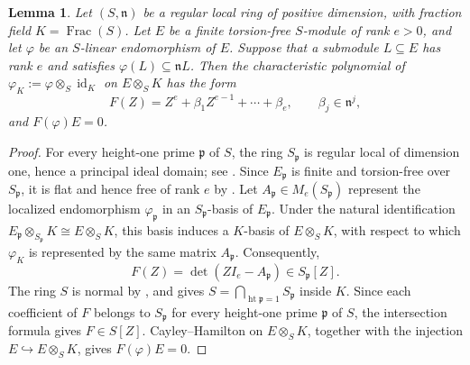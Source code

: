 \documentclass[11pt,reqno]{amsart}
\numberwithin{equation}{section}
\newtheorem{lemma}[theorem]{Lemma}
\theoremstyle{definition}
\begin{document}
\begin{lemma}
\label{lem:characteristic-coefficients}
Let $(S,\mathfrak n)$ be a regular local ring of positive dimension,
with fraction field $K=\operatorname{Frac}(S)$. Let $E$ be a finite
torsion-free $S$-module
of rank $e>0$, and let $\varphi$ be an $S$-linear endomorphism of $E$.
Suppose that a submodule $L\subseteq E$ has rank $e$ and satisfies
$\varphi(L)\subseteq\mathfrak nL$. Then the characteristic polynomial
of $\varphi_K:=\varphi\otimes_S\operatorname{id}_K$ on
$E\otimes_SK$ has the form
\[
 F(Z)=Z^e+\beta_1Z^{e-1}+\cdots+\beta_e,
 \qquad \beta_j\in\mathfrak n^j,
\]
and $F(\varphi)E=0$.
\end{lemma}
\begin{proof}
For every height-one prime $\mathfrak p$ of $S$, the ring
$S_{\mathfrak p}$ is regular local of dimension one, hence a
principal ideal domain; see
\cite[Theorems~11.2 and~19.3]{Matsumura1989}.
Since $E_{\mathfrak p}$ is finite and torsion-free over
$S_{\mathfrak p}$, it is flat and hence free of rank $e$ by
\cite[Theorems~7.7 and~7.10]{Matsumura1989}.
Let $A_{\mathfrak p}\in M_e(S_{\mathfrak p})$ represent the localized
endomorphism $\varphi_{\mathfrak p}$ in an $S_{\mathfrak p}$-basis of
$E_{\mathfrak p}$. Under the natural identification
$E_{\mathfrak p}\otimes_{S_{\mathfrak p}}K\cong E\otimes_SK$,
this basis induces a $K$-basis of $E\otimes_SK$, with respect to
which $\varphi_K$ is represented by the same matrix $A_{\mathfrak p}$.
Consequently,
\[
 F(Z)=\det(ZI_e-A_{\mathfrak p})\in S_{\mathfrak p}[Z].
\]
The ring $S$ is normal by \cite[Theorem~19.4]{Matsumura1989}, and
\cite[Proposition~4.10.4]{HunekeSwanson2006} gives
$S=\bigcap_{\operatorname{ht}\mathfrak p=1}S_{\mathfrak p}$ inside $K$.
Since each coefficient of $F$ belongs to $S_{\mathfrak p}$ for every
height-one prime $\mathfrak p$ of $S$, the intersection formula gives
$F\in S[Z]$.
Cayley--Hamilton on $E\otimes_SK$, together with the injection
$E\hookrightarrow E\otimes_SK$, gives $F(\varphi)E=0$.


\end{proof}
\end{document}
